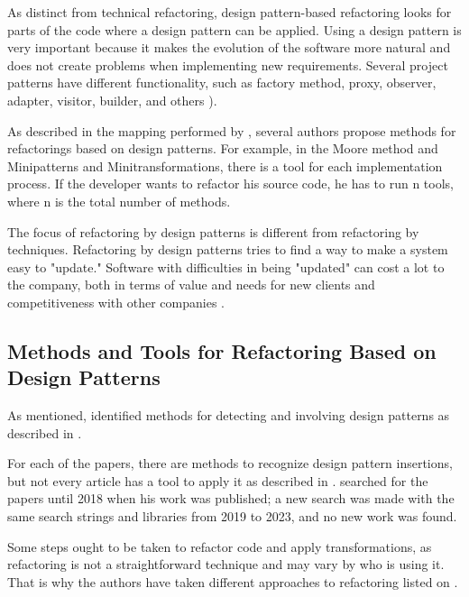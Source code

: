 As distinct from technical refactoring, design pattern-based refactoring looks for parts of the code where a design pattern can be applied. Using a design pattern is very important because it makes the evolution of the software more natural and does not create problems when implementing new requirements. Several project patterns have different functionality, such as factory method, proxy, observer, adapter, visitor, builder, and others \cite{Gamma2009}). 

As described in the mapping performed by \textcite{beluzzo2018abordagem}, several authors propose methods for refactorings based on design patterns. For example, in the Moore method and Minipatterns and Minitransformations, there is a tool for each implementation process. If the developer wants to refactor his source code, he has to run n tools, where n is the total number of methods.

The focus of refactoring by design patterns is different from refactoring by techniques. Refactoring by design patterns tries to find a way to make a system easy to "update." Software with difficulties in being "updated" can cost a lot to the company, both in terms of value and needs for new clients and competitiveness with other companies \cite{cinneide2000automated}.

\subsection{Methods and Tools for Refactoring Based on Design Patterns}
\label{sec-tools}

As mentioned, \textcite{beluzzo2018abordagem} identified methods for detecting and involving design patterns as described in .



For each of the papers, there are methods to recognize design pattern insertions, but not every article has a tool to apply it as described in . \textcite{beluzzo2018abordagem} searched for the papers until 2018 when his work was published; a new search was made with the same search strings and libraries from 2019 to 2023, and no new work was found.

Some steps ought to be taken to refactor code and apply transformations, as refactoring is not a straightforward technique and may vary by who is using it. That is why the authors have taken different approaches to refactoring listed on .

